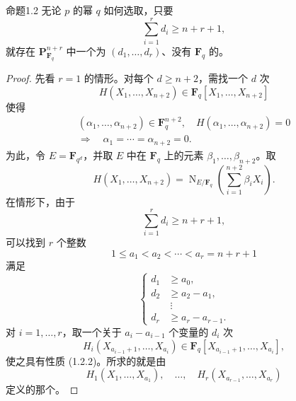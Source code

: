 \begin{SGAresult}{命题}{1.2}
无论 $p$ 的幂 $q$ 如何选取，只要
\[
 \sum_{i=1}^r d_i\geq n+r+1,
\]
就存在 $\mathbf P^{n+r}_{\mathbf F_q}$ 中一个为 $(d_1,\ldots,d_r)$、没有 $\mathbf F_q$ 的。
\end{SGAresult}
\begin{proof}
先看 $r=1$ 的情形。对每个 $d\geq n+2$，需找一个 $d$ 次
\[
 H(X_1,\ldots,X_{n+2})\in\mathbf F_q[X_1,\ldots,X_{n+2}]
 \tag{1.2.1}
\]
使得
\[
 \begin{gathered}
 (\alpha_1,\ldots,\alpha_{n+2})\in\mathbf F_q^{n+2},\quad
 H(\alpha_1,\ldots,\alpha_{n+2})=0\\
 \Longrightarrow\quad\alpha_1=\cdots=\alpha_{n+2}=0.
 \end{gathered}
 \tag{1.2.2}
\]
为此，令 $E=\mathbf F_{q^d}$，并取 $E$ 中在 $\mathbf F_q$ 上的元素 $\beta_1,\ldots,\beta_{n+2}$。取
\[
 H(X_1,\ldots,X_{n+2})=
 \operatorname N_{E/\mathbf F_q}\left(\sum_{i=1}^{n+2}\beta_iX_i\right).
 \tag{1.2.3}
\]
在情形下，由于
\[
 \sum_{i=1}^r d_i\geq n+r+1,
 \tag{1.2.4}
\]
可以找到 $r$ 个整数
\[
 1\leq a_1<a_2<\cdots<a_r=n+r+1
 \tag{1.2.5}
\]
满足
\[
 \left\{\begin{aligned}
 d_1&\geq a_0,\\
 d_2&\geq a_2-a_1,\\
 &\ \vdots\\
 d_r&\geq a_r-a_{r-1}.
 \end{aligned}\right.
 \tag{1.2.6}
\]
对 $i=1,\ldots,r$，取一个关于 $a_i-a_{i-1}$ 个变量的 $d_i$ 次
\[
 H_i(X_{a_{i-1}+1},\ldots,X_{a_i})
 \in\mathbf F_q[X_{a_{i-1}+1},\ldots,X_{a_i}],
\]
使之具有性质 (1.2.2)。所求的就是由
\[
 H_1(X_1,\ldots,X_{a_1}),\quad\ldots,\quad
 H_r(X_{a_{r-1}},\ldots,X_{a_r})
\]
定义的那个。
\end{proof}

